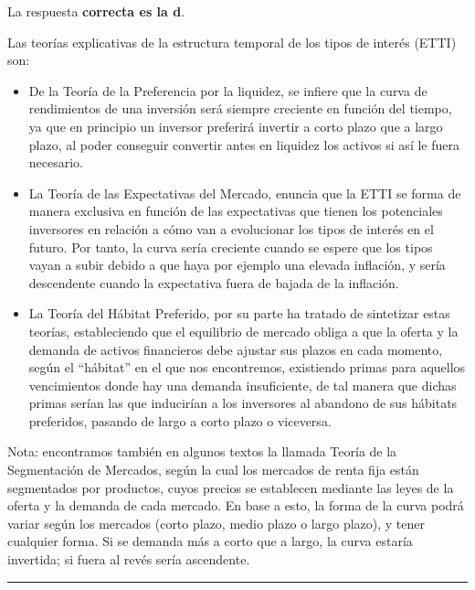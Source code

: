 \documentclass[
  letterpaper,
  DIV=11,
  numbers=noendperiod]{scrreprt}
\begin{document}
\begin{tcolorbox}
\begin{tcolorbox}[enhanced jigsaw, toprule=.15mm, left=2mm, arc=.35mm, breakable, bottomrule=.15mm, opacityback=0, rightrule=.15mm, leftrule=.75mm, colframe=quarto-callout-note-color-frame, colback=white]
\begin{minipage}[t]{\textwidth - 5.5mm}
La respuesta \textbf{correcta es la d}.

Las teorías explicativas de la estructura temporal de los tipos de
interés (ETTI) son:

\begin{itemize}
\item
  De la Teoría de la Preferencia por la liquidez, se infiere que la
  curva de rendimientos de una inversión será siempre creciente en
  función del tiempo, ya que en principio un inversor preferirá invertir
  a corto plazo que a largo plazo, al poder conseguir convertir antes en
  liquidez los activos si así le fuera necesario.
\item
  La Teoría de las Expectativas del Mercado, enuncia que la ETTI se
  forma de manera exclusiva en función de las expectativas que tienen
  los potenciales inversores en relación a cómo van a evolucionar los
  tipos de interés en el futuro. Por tanto, la curva sería creciente
  cuando se espere que los tipos vayan a subir debido a que haya por
  ejemplo una elevada inflación, y sería descendente cuando la
  expectativa fuera de bajada de la inflación.
\item
  La Teoría del Hábitat Preferido, por su parte ha tratado de sintetizar
  estas teorías, estableciendo que el equilibrio de mercado obliga a que
  la oferta y la demanda de activos financieros debe ajustar sus plazos
  en cada momento, según el ``hábitat'' en el que nos encontremos,
  existiendo primas para aquellos vencimientos donde hay una demanda
  insuficiente, de tal manera que dichas primas serían las que
  inducirían a los inversores al abandono de sus hábitats preferidos,
  pasando de largo a corto plazo o viceversa.
\end{itemize}

Nota: encontramos también en algunos textos la llamada Teoría de la
Segmentación de Mercados, según la cual los mercados de renta fija están
segmentados por productos, cuyos precios se establecen mediante las
leyes de la oferta y la demanda de cada mercado. En base a esto, la
forma de la curva podrá variar según los mercados (corto plazo, medio
plazo o largo plazo), y tener cualquier forma. Si se demanda más a corto
que a largo, la curva estaría invertida; si fuera al revés sería
ascendente.

\end{minipage}%
\end{tcolorbox}

\begin{center}\rule{0.5\linewidth}{0.5pt}\end{center}


\end{tcolorbox}
\end{document}
